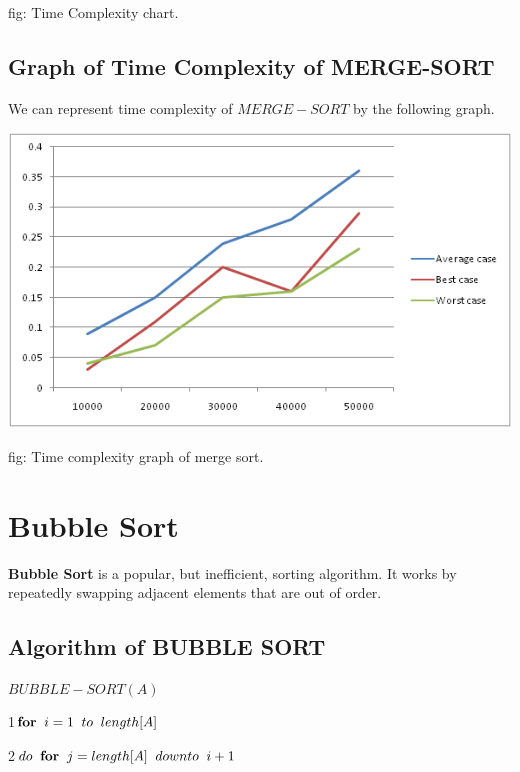 \documentclass[12 pt,a4paper]{report}
\begin{document}
\hspace{5cm}fig: Time Complexity chart.

\subsection{Graph of Time Complexity of MERGE-SORT}

We can represent time complexity of $MERGE-SORT$ by the following graph.


\includegraphics{mergesort.png}

\hspace{5cm}fig: Time complexity  graph  of merge sort.

\section{Bubble Sort}



\textbf{Bubble Sort} is a popular, but inefficient, sorting algorithm. It works by repeatedly swapping adjacent elements that are out of order.

\subsection{Algorithm of BUBBLE SORT}

\vspace{1cm}

$BUBBLE-SORT(A)$

1\hspace{0.5cm}$\textbf{for}\hspace{0.2cm}i=1\hspace{0.2cm}to\hspace{0.2cm}length[A]$

2\hspace{1cm}$do\hspace{0.2cm}\textbf{for}\hspace{0.2cm}j=length[A]\hspace{0.2cm}downto\hspace{0.2cm}i+1$
\end{document}
